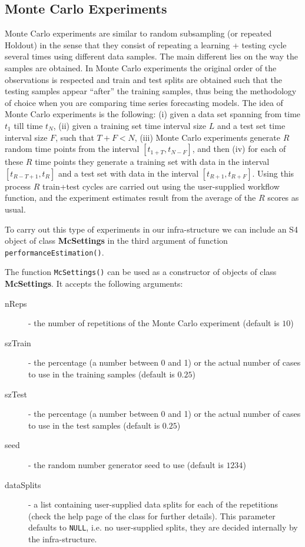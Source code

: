\documentclass[10pt,a4paper]{article}\usepackage[]{graphicx}\usepackage[]{color}
\begin{document}
\subsection{Monte Carlo Experiments}

Monte Carlo experiments are similar to random subsampling (or repeated
Holdout) in the sense that they consist of repeating a learning +
testing cycle several times using different data samples. The main
different lies on the way the samples are obtained. In Monte Carlo
experiments the original order of the observations is respected and
train and test splits are obtained such that the testing samples
appear ``after'' the training samples, thus being the methodology of
choice when you are comparing time series forecasting models. The idea
of Monte Carlo experiments is the following: (i) given a data set
spanning from time $t_1$ till time $t_N$, (ii) given a training set
time interval size $L$ and a test set time interval size $F$, such
that $T+F < N$, (iii) Monte Carlo experiments generate $R$ random time
points from the interval $[t_{1+T},t_{N-F}]$, and then (iv) for each
of these $R$ time points they generate a training set with data in the
interval $[t_{R-T+1},t_{R}]$ and a test set with data in the interval
$[t_{R+1},t_{R+F}]$. Using this process $R$ train+test cycles are
carried out using the user-supplied workflow function, and the
experiment estimates result from the average of the $R$ scores as
usual.

To carry out this type of experiments in our infra-structure we can
include an S4 object of class \textbf{McSettings} in the third
argument of function \texttt{performanceEstimation()}.

The function \texttt{McSettings()} can be used as a constructor of
objects of class \textbf{McSettings}. It accepts the following
arguments:

\begin{description}
\item[nReps] - the number of repetitions of the Monte Carlo experiment (default is $10$)
\item[szTrain] - the percentage (a number between 0 and 1) or the actual number of cases to use in the training samples (default is $0.25$)
\item[szTest] - the percentage (a number between 0 and 1) or the actual  number of cases to use in the test samples (default is $0.25$)
\item[seed] - the random number generator seed to use (default is $1234$)
\item[dataSplits] - a list containing user-supplied data splits
  for each of the repetitions (check the help page of the
  class for further details). This parameter defaults to
  \texttt{NULL}, i.e. no user-supplied splits, they are decided
  internally by the infra-structure.
\end{description}
\end{document}
